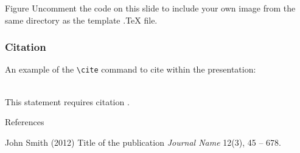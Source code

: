 \documentclass[aspectratio=169,xcolor=dvipsnames]{beamer}
\begin{document}

\begin{frame}{Figure}
    Uncomment the code on this slide to include your own image from the same directory as the template .TeX file.
\end{frame}


\begin{frame}[fragile] %
    \frametitle{Citation}
    An example of the \verb|\cite| command to cite within the presentation:\\~

    This statement requires citation \cite{p1}.
\end{frame}


\begin{frame}{References}
    \footnotesize{
        \begin{thebibliography}{99}
             John Smith (2012)
            \newblock Title of the publication
            \newblock \emph{Journal Name} 12(3), 45 -- 678.
        \end{thebibliography}
    }
\end{frame}

\end{document}

